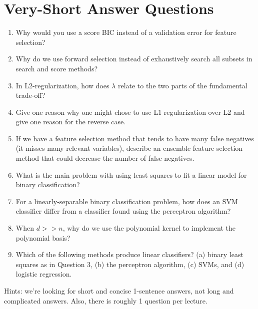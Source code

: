\documentclass{article}
\def\enum#1{\begin{enumerate}#1\end{enumerate}}
\begin{document}
\section{Very-Short Answer Questions}

\enum{
\item Why would you use a score BIC instead of a validation error for feature selection?
\item Why do we use forward selection instead of exhaustively search all subsets in search and score methods?
\item In L2-regularization, how does $\lambda$ relate to the two parts of the fundamental trade-off?
\item Give one reason why one might chose to use L1 regularization over L2 and give one reason for the reverse case.
\item If we have a feature selection method that tends to have many false negatives (it misses many relevant variables), describe an ensemble feature selection method that could decrease the number of false negatives.
\item What is the main problem with using least squares to fit a linear model for binary classification?
\item For a linearly-separable binary classification problem, how does an SVM classifier differ from a classifier found using the perceptron algorithm?
\item When $d >> n$, why do we use the polynomial kernel to implement the polynomial basis?
\item Which of the following methods produce linear classifiers? (a) binary least squares as in Question 3, (b) the perceptron algorithm, (c) SVMs, and (d) logistic regression.
}

Hints: we're looking for short and concise 1-sentence answers, not long and complicated answers. Also, there is roughly 1 question per lecture.
\end{document}
